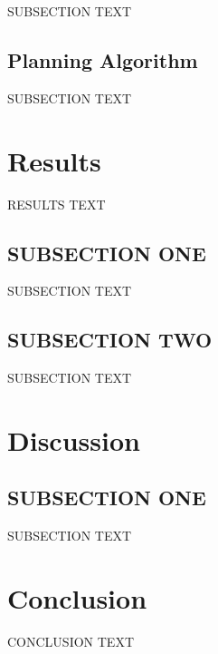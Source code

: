 \documentclass[letterpaper, 10 pt, conference]{ieeeconf}  %
\begin{document}
SUBSECTION TEXT

\subsection{Planning Algorithm}

SUBSECTION TEXT

\section{Results}

RESULTS TEXT

\subsection{SUBSECTION ONE}

SUBSECTION TEXT

\subsection{SUBSECTION TWO}

SUBSECTION TEXT

\section{Discussion}

\subsection{SUBSECTION ONE}

SUBSECTION TEXT

\section{Conclusion}

CONCLUSION TEXT



\end{document}
